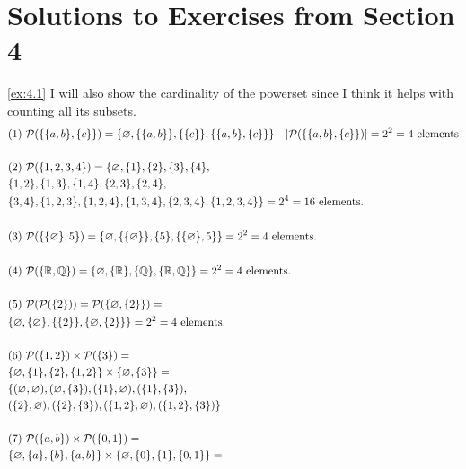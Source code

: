 \section*{Solutions to Exercises from Section 4}
\begin{solution}\label{sol:4.1}\ref{ex:4.1}
    I will also show the cardinality of the powerset since I think it helps with counting all its subsets.
    $$
    \begin{aligned}
        &(1)~\powerset(\{\{ a,b \},\{ c \}\}) = \{ \varnothing,\{ \{ a,b \} \},\{ \{ c \} \},\{ \{ a,b \},\{ c \} \} \}\quad  \lvert \powerset(\{ \{ a,b \},\{ c \} \}) \rvert=2^2=4 \text{ elements}\\\\
        &(2)~\powerset(\{ 1,2,3,4 \})= \{ \varnothing,\{ 1 \},\{ 2 \},\{ 3 \},\{ 4 \},\\
        &\{ 1,2 \},\{ 1,3 \},\{ 1,4 \},\{ 2,3 \},\{ 2,4 \},\\
        &\{ 3,4 \},\{ 1,2,3 \},\{ 1,2,4 \},\{ 1,3,4 \},\{ 2,3,4 \},\{ 1,2,3,4 \} \}=2^4=16 \text{ elements}. \\\\
        &(3)~\powerset(\{ \{ \varnothing \},5 \})= \{ \varnothing,\{ \{ \varnothing \} \},\{ 5 \}, \{ \{ \varnothing \},5 \} \}=2^2=4 \text{ elements}.\\\\
        &(4)~ \powerset(\{ \R,\Q \})= \{ \varnothing, \{ \R \},\{ \Q \},\{ \R,\Q \} \}=2^2=4 \text{ elements}. \\\\
        &(5)~\powerset(\powerset(\{ 2 \}))=\powerset(\{ \varnothing, \{ 2 \} \})=\\
        &\{ \varnothing,\{ \varnothing \}, \{ \{ 2 \} \}, \{ \varnothing, \{ 2 \} \} \}=2^2=4 \text{ elements.}\\\\
        &(6)~\powerset(\{ 1,2 \})\times\powerset(\{ 3 \})=\\
        &\{ \varnothing,\{ 1 \},\{ 2 \},\{ 1,2 \} \}\times \{ \varnothing, \{ 3 \} \}=\\
        & \{ (\varnothing, \varnothing), (\varnothing, \{ 3 \}), (\{ 1 \},\varnothing), (\{ 1 \},\{ 3 \}),\\
        & (\{ 2 \},\varnothing),(\{ 2 \},\{ 3 \}), (\{ 1,2 \},\varnothing),(\{ 1,2 \},\{ 3 \}) \}\\\\
        &(7)~\powerset(\{ a,b \})\times\powerset(\{ 0,1 \})=\\
        & \{ \varnothing,\{ a \},\{ b \},\{ a,b \} \}\times \{ \varnothing,\{ 0 \},\{ 1 \},\{ 0,1 \} \}=\\

\end{aligned}$$
\end{solution}
